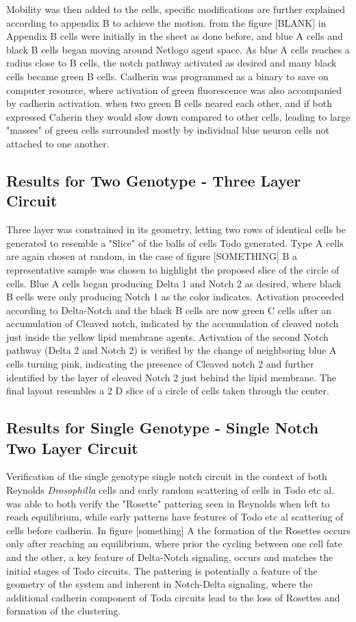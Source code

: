 Mobility was then added to the cells, specific modifications are further explained according to appendix B to achieve the motion. from the figure [BLANK] in Appendix B cells were initially in the sheet as done before, and blue A cells and black B cells began moving around Netlogo agent space. As blue A cells reaches a radius close to B cells, the notch pathway activated as desired and many black cells became green B cells. Cadherin was programmed as a binary to save on computer resource, where activation of green fluorescence was also accompanied by cadherin activation. when two green B cells neared each other, and if both expressed Caherin they would slow down compared to other cells, leading to large "masses" of green cells surrounded mostly by individual blue neuron cells not attached to one another. 

\subsection{Results for Two Genotype - Three Layer Circuit} 

Three layer was constrained in its geometry, letting two rows of identical cells be generated to resemble a "Slice" of the balls of cells Todo generated.  Type A cells are again chosen at random, in the case of figure [SOMETHING] B a representative sample was chosen to highlight the proposed slice of the circle of cells. Blue A cells began producing Delta 1 and Notch 2 as desired, where black B cells were only producing Notch 1 as the color indicates. Activation proceeded according to Delta-Notch and the black B cells are now green C cells after an accumulation of Cleaved notch, indicated by the accumulation of cleaved notch just inside the yellow lipid membrane agents. Activation of the second Notch pathway (Delta 2 and Notch 2) is verified by the change of neighboring blue A cells turning pink, indicating the presence of Cleaved notch 2 and further identified by the layer of cleaved Notch 2 just behind the lipid membrane. The final layout resembles a 2 D slice of a circle of cells taken through the center.

\subsection{Results for Single Genotype - Single Notch Two Layer Circuit} 

Verification of the single genotype single notch circuit in the context of both Reynolds \emph{Drosophilla} cells and early random scattering of cells in Todo etc al. was able to both verify the "Rosette" pattering seen in Reynolds when left to reach equilibrium, while early patterns have features of Todo etc al scattering of cells before cadherin. In figure [something] A the formation of the Rosettes occurs only after reaching an equilibrium, where prior the cycling between one cell fate and the other, a key feature of Delta-Notch signaling, occurs and matches the initial stages of Todo circuits. The pattering is potentially a feature of the geometry of the system and inherent in Notch-Delta signaling, where the additional cadherin component of Toda circuits lead to the loss of Rosettes and formation of the clustering. 

